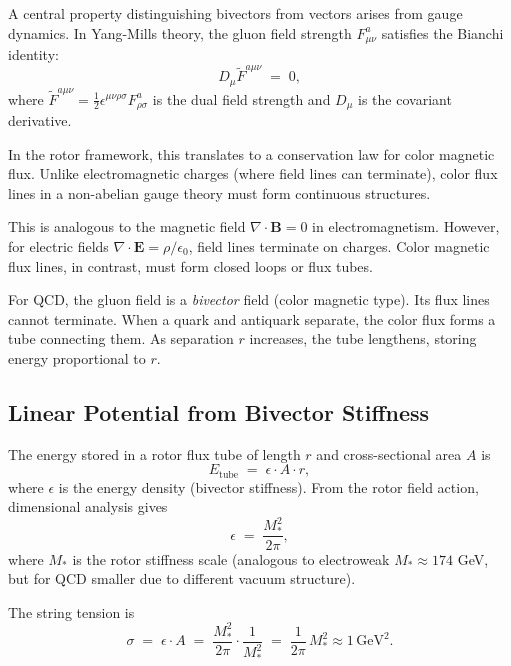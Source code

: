 \documentclass[11pt,a4paper]{article}
\theoremstyle{definition}
\theoremstyle{plain}
\theoremstyle{remark}
\begin{document}
A central property distinguishing bivectors from vectors arises from gauge dynamics. In Yang-Mills theory, the gluon field strength $F_{\mu\nu}^a$ satisfies the Bianchi identity:
\begin{equation}
D_\mu \tilde{F}^{a\mu\nu} \;=\; 0,
\label{eq:bianchi-identity}
\end{equation}
where $\tilde{F}^{a\mu\nu} = \frac{1}{2}\epsilon^{\mu\nu\rho\sigma}F_{\rho\sigma}^a$ is the dual field strength and $D_\mu$ is the covariant derivative.

In the rotor framework, this translates to a conservation law for color magnetic flux. Unlike electromagnetic charges (where field lines can terminate), color flux lines in a non-abelian gauge theory must form continuous structures.

This is analogous to the magnetic field $\nabla \cdot \mathbf{B} = 0$ in electromagnetism. However, for electric fields $\nabla \cdot \mathbf{E} = \rho/\epsilon_0$, field lines terminate on charges. Color magnetic flux lines, in contrast, must form closed loops or flux tubes.

For QCD, the gluon field is a \emph{bivector} field (color magnetic type). Its flux lines cannot terminate. When a quark and antiquark separate, the color flux forms a tube connecting them. As separation $r$ increases, the tube lengthens, storing energy proportional to $r$.

\subsection{Linear Potential from Bivector Stiffness}

The energy stored in a rotor flux tube of length $r$ and cross-sectional area $A$ is
\begin{equation}
E_{\mathrm{tube}} \;=\; \epsilon \cdot A \cdot r,
\label{eq:tube-energy}
\end{equation}
where $\epsilon$ is the energy density (bivector stiffness). From the rotor field action, dimensional analysis gives
\begin{equation}
\epsilon \;=\; \frac{M_\ast^2}{2\pi},
\end{equation}
where $M_\ast$ is the rotor stiffness scale (analogous to electroweak $M_\ast \approx 174$ GeV, but for QCD smaller due to different vacuum structure).

The string tension is
\begin{equation}
\sigma \;=\; \epsilon \cdot A \;=\; \frac{M_\ast^2}{2\pi} \cdot \frac{1}{M_\ast^2} \;=\; \frac{1}{2\pi}\,M_\ast^2 \approx 1\,\text{GeV}^2.
\end{equation}
\end{document}
